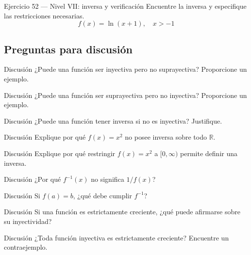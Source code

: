 \documentclass[aspectratio=169,10pt]{beamer}
\begin{document}
\begin{frame}{Ejercicio 52 — Nivel VII: inversa y verificación}
Encuentre la inversa y especifique las restricciones necesarias.
\[
f(x)=\ln(x+1),\quad x>-1
\]
\end{frame}

\subsection{Preguntas para discusión}
\begin{frame}{Discusión}
\Large ¿Puede una función ser inyectiva pero no suprayectiva? Proporcione un ejemplo.
\end{frame}

\begin{frame}{Discusión}
\Large ¿Puede una función ser suprayectiva pero no inyectiva? Proporcione un ejemplo.
\end{frame}

\begin{frame}{Discusión}
\Large ¿Puede una función tener inversa si no es inyectiva? Justifique.
\end{frame}

\begin{frame}{Discusión}
\Large Explique por qué $f(x)=x^2$ no posee inversa sobre todo $\mathbb R$.
\end{frame}

\begin{frame}{Discusión}
\Large Explique por qué restringir $f(x)=x^2$ a $[0,\infty)$ permite definir una inversa.
\end{frame}

\begin{frame}{Discusión}
\Large ¿Por qué $f^{-1}(x)$ no significa $1/f(x)$?
\end{frame}

\begin{frame}{Discusión}
\Large Si $f(a)=b$, ¿qué debe cumplir $f^{-1}$?
\end{frame}

\begin{frame}{Discusión}
\Large Si una función es estrictamente creciente, ¿qué puede afirmarse sobre su inyectividad?
\end{frame}

\begin{frame}{Discusión}
\Large ¿Toda función inyectiva es estrictamente creciente? Encuentre un contraejemplo.
\end{frame}
\end{document}
